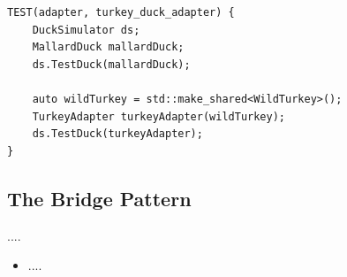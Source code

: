 \documentclass[11pt]{article}
\begin{document}
\begin{itemize}
\begin{multicols}{2}
\begin{lstlisting}
TEST(adapter, turkey_duck_adapter) {
    DuckSimulator ds;
    MallardDuck mallardDuck;
    ds.TestDuck(mallardDuck);

    auto wildTurkey = std::make_shared<WildTurkey>();
    TurkeyAdapter turkeyAdapter(wildTurkey);
    ds.TestDuck(turkeyAdapter);
}
            \end{lstlisting}
        \end{multicols}
    \end{itemize}

    \subsection{The Bridge Pattern}
    ....
    \begin{itemize}
        \item ....
    \end{itemize}
\end{document}
